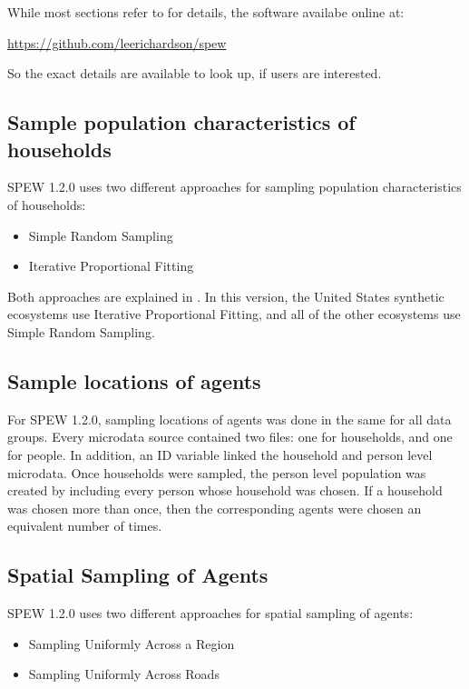 \documentclass{article}
\begin{document}
While most sections refer to \cite{spew} for details, the software availabe online at:

\vspace{2mm}
	\url{https://github.com/leerichardson/spew}
\vspace{2mm}

So the exact details are available to look up, if users are interested. 

\subsection{Sample population characteristics of households}
SPEW 1.2.0 uses two different approaches for sampling population characteristics of households:

\begin{itemize}
	\item Simple Random Sampling
	\item Iterative Proportional Fitting
\end{itemize}

Both approaches are explained in \cite{spew}. In this version, the United States synthetic ecosystems use Iterative Proportional Fitting, and all of the other ecosystems use Simple Random Sampling. 

\subsection{Sample locations of agents}
For SPEW 1.2.0, sampling locations of agents was done in the same for all data groups. Every microdata source contained two files: one for households, and one for people. In addition, an ID variable linked the household and person level microdata. Once households were sampled, the person level population was created by including every person whose household was chosen. If a household was chosen more than once, then the corresponding agents were chosen an equivalent number of times. 

\subsection{Spatial Sampling of Agents}
SPEW 1.2.0 uses two different approaches for spatial sampling of agents:

\begin{itemize}
	\item Sampling Uniformly Across a Region
	\item Sampling Uniformly Across Roads
\end{itemize}
\end{document}
